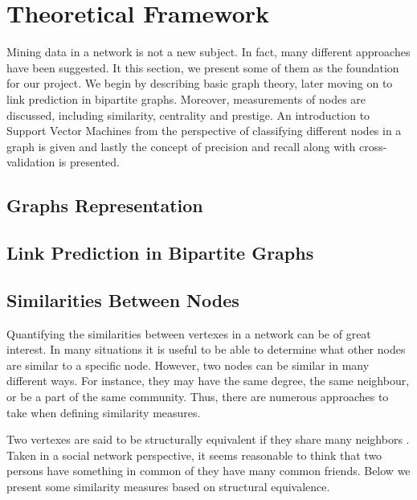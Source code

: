 \chapter{Theoretical Framework}
Mining data in a network is not a new subject. In fact, many different approaches have been suggested. It this section, we present some of them as the foundation for our project. We begin by describing basic graph theory, later moving on to link prediction in bipartite graphs. Moreover, measurements of nodes are discussed, including similarity, centrality and prestige. An introduction to Support Vector Machines from the perspective of classifying different nodes in a graph is given and lastly the concept of precision and recall along with cross-validation is presented.

\section{Graphs Representation}


\section{Link Prediction in Bipartite Graphs}


\section{Similarities Between Nodes \label{sim}}
Quantifying the similarities between vertexes in a network can be of great interest. In many situations it is useful to be able to determine what other nodes are similar to a specific node. However, two nodes can be similar in many different ways. For instance, they may have the same degree, the same neighbour, or be a part of the same community. Thus, there are numerous approaches to take when defining similarity measures.

Two vertexes are said to be structurally equivalent if they share many neighbors \cite{leicht2006}. Taken in a social network perspective, it seems reasonable to think that two persons have something in common of they have many common friends. Below we present some similarity measures based on structural equivalence.

